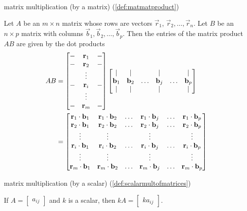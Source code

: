 \documentclass{ximera}
\begin{document}
matrix multiplication (by a matrix) (\ref{def:matmatproduct})
\begin{expandable}
    Let $A$ be an $m\times n$ matrix whose rows are vectors $\vec{r}_1$, $\vec{r}_2,\ldots ,\vec{r}_n$.  Let $B$ be an $n\times p$ matrix with columns $\vec{b}_1, \vec{b}_2, \ldots, \vec{b}_p$.  Then the entries of the matrix product $AB$ are given by the dot products
\begin{align*}AB&=\begin{bmatrix}-&\mathbf{r}_1&-\\-&\mathbf{r}_2&-\\ &\vdots & \\-&\mathbf{r}_i &-\\ &\vdots& \\-&\mathbf{r}_m&-\end{bmatrix}\begin{bmatrix}|&|&&|&&|\\\mathbf{b}_1& \mathbf{b}_2 &\ldots  & \mathbf{b}_j&\ldots& \mathbf{b}_p\\|&|&&|&&|\end{bmatrix}\\ &=\begin{bmatrix}\mathbf{r}_1\cdot \mathbf{b}_1&\mathbf{r}_1\cdot \mathbf{b}_2&\ldots&\mathbf{r}_1\cdot \mathbf{b}_j&\ldots &\mathbf{r}_1\cdot \mathbf{b}_p\\\mathbf{r}_2\cdot \mathbf{b}_1&\mathbf{r}_2\cdot \mathbf{b}_2&\ldots&\mathbf{r}_2\cdot \mathbf{b}_j&\ldots &\mathbf{r}_2\cdot \mathbf{b}_p\\\vdots&\vdots&&\vdots&&\vdots\\\mathbf{r}_i\cdot \mathbf{b}_1&\mathbf{r}_i\cdot \mathbf{b}_2&\ldots&\mathbf{r}_i\cdot \mathbf{b}_j&\ldots &\mathbf{r}_i\cdot \mathbf{b}_p\\\vdots&\vdots&&\vdots&&\vdots\\\mathbf{r}_m\cdot \mathbf{b}_1&\mathbf{r}_m\cdot \mathbf{b}_2&\ldots&\mathbf{r}_m\cdot \mathbf{b}_j&\ldots &\mathbf{r}_m\cdot \mathbf{b}_p\end{bmatrix}
\end{align*}
\end{expandable}

matrix multiplication (by a scalar) (\ref{def:scalarmultofmatrices})
\begin{expandable}
    If $A=\begin{bmatrix} a_{ij}\end{bmatrix} $ and $k$ is a scalar,
then $kA=\begin{bmatrix} ka_{ij}\end{bmatrix}$. 
\end{expandable}
\end{document}
